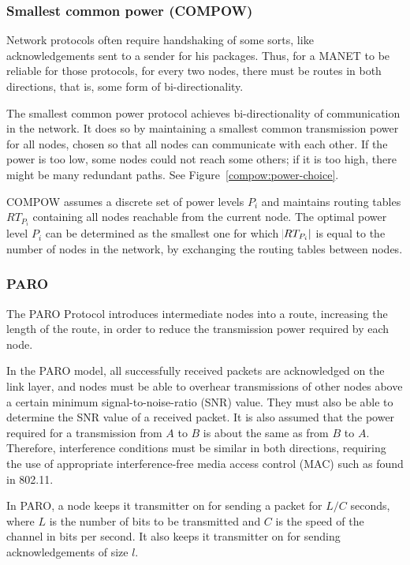 \subsubsection{Smallest common power (COMPOW)}
Network protocols often require handshaking of some sorts, like acknowledgements
sent to a sender for his packages. Thus, for a MANET to be reliable for those
protocols, for every two nodes, there must be routes in both directions, that
is, some form of bi-directionality.

The smallest common power protocol\cite{narayanaswamy2002power} achieves bi-directionality
of communication in the network.
It does so by maintaining a smallest common transmission power for all nodes,
chosen so that all nodes can communicate with each other. If the power is too
low, some nodes could not reach some others; if it is too high, there might be
many redundant paths. See Figure~\ref{compow:power-choice}.

COMPOW assumes a discrete set of power levels $P_{i}$ and maintains routing
tables ${RT}_{P_{i}}$ containing all nodes reachable from the current node. The
optimal power level $P_{i}$ can be determined as the smallest one for which
$\abs{RT_{P_{i}}}$ is equal to the number of nodes in the network, by
exchanging the routing tables between nodes.


\subsubsection{PARO}
The PARO Protocol\cite{gomez2003paro} introduces intermediate nodes into a
route, increasing the length of the route, in order to reduce the transmission
power required by each node.

In the PARO model, all successfully received packets are acknowledged on the
link layer, and nodes must be able to overhear transmissions of other nodes
above a certain minimum signal-to-noise-ratio (SNR) value. They must also
be able to determine the SNR value of a received packet. It is also assumed
that the power required for a transmission from $A$ to $B$ is about the same
as from $B$ to $A$. Therefore, interference conditions must be similar in both
directions, requiring the use of appropriate interference-free media access
control (MAC) such as found in 802.11.

In PARO, a node keeps it transmitter on for sending a packet for $L/C$ seconds,
where $L$ is the number of bits to be transmitted and $C$ is the speed of the
channel in bits per second.
It also keeps it transmitter on for sending acknowledgements of size $l$.

